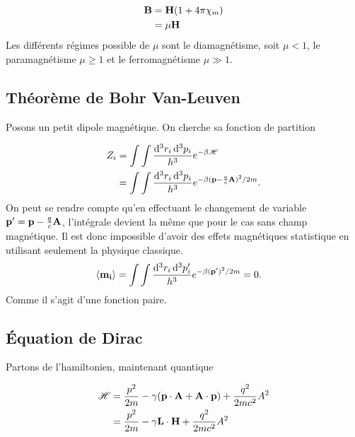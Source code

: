 \begin{align}
    \vb{B}&=\vb{H}\qty(1+4\pi\chi_m)\\
          &=\mu\vb{H}
\end{align}
Les différents régimes possible de $\mu$ sont le diamagnétisme, soit $\mu<1$,
le paramagnétisme $\mu\ge1$ et le ferromagnétisme $\mu\gg1$.


\subsection{Théorème de Bohr Van-Leuven} %
\label{sub:Théorème de Bohr Van-Leuven}

Posons un petit dipole magnétique. On cherche sa fonction de partition

\begin{align}
    Z_i&=\int\int\frac{\dd[3]{r_i}\dd[3]{p_i}}{h^3}e^{-\beta \mathscr{H}}\\
       &=\int\int\frac{\dd[3]{r_i}\dd[3]{p_i}}{h^3}e^{-\beta (\vb{p}-\frac qc\vb{A})^2/2m}.
\end{align}
On peut se rendre compte qu'en effectuant le changement de variable $\vb{p'}=\vb{p}-\frac qc\vb{A}$,
l'intégrale devient la même que pour le cas sans champ magnétique. Il est donc
impossible d'avoir des effets magnétiques statistique en utilisant seulement
la physique classique.
\begin{align}
    \expval{\vb{m_i}}&=
       \int\int\frac{\dd[3]{r_i}\dd[3]{p_i'}}{h^3}e^{-\beta (\vb{p'})^2/2m} = 0.
\end{align}
Comme il s'agit d'une fonction paire.


\subsection{Équation de Dirac} %
\label{sub:Équation de Dirac}

Partons de l'hamiltonien, maintenant quantique

\begin{align}
    \mathscr{H}&=\frac{p^2}{2m}-\gamma\qty(\vb{p}\cdot\vb{A}+\vb{A}\cdot\vb{p})
    +\frac{q^2}{2mc^2}A^2\\
               &=\frac{p^2}{2m}-\gamma\vb{L}\cdot\vb{H}+\frac{q^2}{2mc^2}A^2
\end{align}

